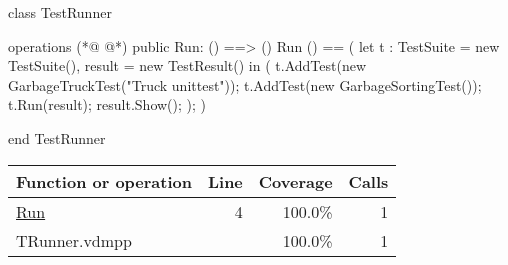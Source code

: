 \begin{vdmpp}[breaklines=true]
class TestRunner

operations
(*@
\label{Run:4}
@*)
public Run: () ==> ()
Run () == 
( 
    let t : TestSuite = new TestSuite(), result = new TestResult()
    in
    (
    t.AddTest(new GarbageTruckTest("Truck unittest"));
    t.AddTest(new GarbageSortingTest());
    t.Run(result);
    result.Show();
    );
)

end TestRunner
\end{vdmpp}
\bigskip
\begin{longtable}{|l|r|r|r|}
\hline
Function or operation & Line & Coverage & Calls \\
\hline
\hline
\hyperref[Run:4]{Run} & 4&100.0\% & 1 \\
\hline
\hline
TRunner.vdmpp & & 100.0\% & 1 \\
\hline
\end{longtable}

